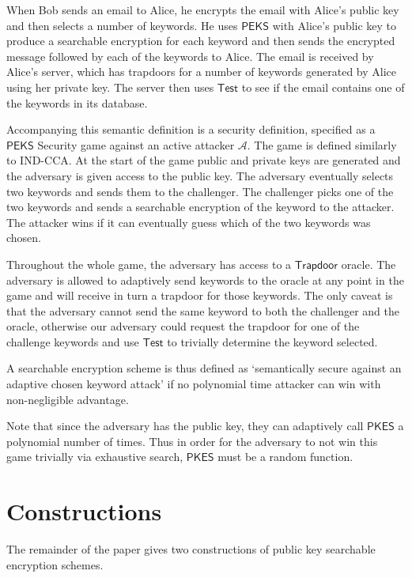 \documentclass[a4paper,11pt]{article}
\begin{document}
    When Bob sends an email to Alice, he encrypts the email with Alice's public key and then selects a number of keywords. He uses $\mathsf{PEKS}$ with Alice's public key to produce a searchable encryption for each keyword and then sends the encrypted message followed by each of the keywords to Alice. The email is received by Alice's server, which has trapdoors for a number of keywords generated by Alice using her private key. The server then uses $\mathsf{Test}$ to see if the email contains one of the keywords in its database.

    Accompanying this semantic definition is a security definition, specified as a $\mathsf{PEKS}$ Security game against an active attacker $\mathcal{A}$. The game is defined similarly to IND-CCA. At the start of the game public and private keys are generated and the adversary is given access to the public key. The adversary eventually selects two keywords and sends them to the challenger. The challenger picks one of the two keywords and sends a searchable encryption of the keyword to the attacker. The attacker wins if it can eventually guess which of the two keywords was chosen.

    Throughout the whole game, the adversary has access to a $\mathsf{Trapdoor}$ oracle. The adversary is allowed to adaptively send keywords to the oracle at any point in the game and will receive in turn a trapdoor for those keywords. The only caveat is that the adversary cannot send the same keyword to both the challenger and the oracle, otherwise our adversary could request the trapdoor for one of the challenge keywords and use $\mathsf{Test}$ to trivially determine the keyword selected.

    A searchable encryption scheme is thus defined as `semantically secure against an adaptive chosen keyword attack' if no polynomial time attacker can win with non-negligible advantage.

    Note that since the adversary has the public key, they can adaptively call $\mathsf{PKES}$ a polynomial number of times. Thus in order for the adversary to not win this game trivially via exhaustive search, $\mathsf{PKES}$ must be a random function.

    \section{Constructions}

    The remainder of the paper gives two constructions of public key searchable encryption schemes.
\end{document}
